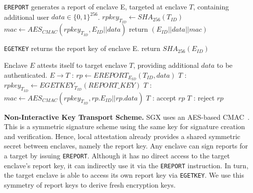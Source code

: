 \documentclass{sig-alternate-05-2015}
\begin{document}
\balance

\vspace{0.8em}
\begin{algorithm}[H]
\begin{algorithmic}
\STATE \verb!EREPORT! generates a report of enclave E, targeted at enclave $T$, containing additional user $data \in \{0,1\}^{256}$.
\STATE $rpkey_{T_{ID}} \leftarrow SHA_{256}(T_{ID})$
\STATE $mac \leftarrow AES_{CMAC}(rpkey_{T_{ID}}, E_{ID} || data)$
\STATE return $(E_{ID} || data || mac)$
\end{algorithmic}
\caption{$EREPORT_{E_{ID}}(T_{ID}, data)$}
\label{alg:ereport}
\end{algorithm}
\vspace{0.8em}

\begin{algorithm}[H]
\begin{algorithmic}
\STATE \verb!EGETKEY! returns the report key of enclave E.
\STATE return $SHA_{256}(E_{ID})$
\ENDIF
\end{algorithmic}
\caption{$EGETKEY_{E_{ID}}(key\_type)$}
\label{alg:egetkey}
\end{algorithm}
\vspace{0.8em}

\begin{algorithm}[H]
\begin{algorithmic}
\STATE Enclave $E$ attests itself to target enclave $T$, providing additional $data$ to be authenticated.
\STATE $E\rightarrow{T}$ : $rp \leftarrow EREPORT_{E_{ID}}(T_{ID}, data)$
\STATE $T$ : $rpkey_{T_{ID}} \leftarrow EGETKEY_{T_{ID}}(REPORT\_KEY)$
\STATE $T$ : $mac \leftarrow AES_{CMAC}(rpkey_{T_{ID}}, rp.E_{ID} || rp.data)$
 \STATE $T$ : accept $rp$ \ELSE \STATE $T$ : reject $rp$ \ENDIF
\end{algorithmic}
\caption{$LocalAttestation_{E_{ID}}(T_{ID}, data)$}
\label{alg:local_attestation}
\end{algorithm}


\textbf{Non-Interactive Key Transport Scheme.}
SGX uses an AES-based CMAC~\cite{aes_cmac}. 
This is a symmetric signature scheme using the same key for signature creation and verification. 
Hence, local attestation already provides a shared symmetric secret between enclaves, namely the report key. 
Any enclave can sign reports for a target by issuing \verb!EREPORT!. 
Although it has no direct access to the target enclave's report key, it can indirectly use it via the \verb!EREPORT! instruction. 
In turn, the target enclave is able to access its own report key via \verb!EGETKEY!. 
We use this symmetry of report keys to derive fresh encryption keys. 
\end{document}
